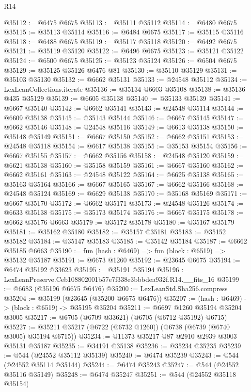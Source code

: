 \begin{lexlean}{R14}
\begin{coremodule}
@35112 := @6475 @6675
@35113 := @35111 @35112
@35114 := @6480 @6675
@35115 := @35113 @35114
@35116 := @6484 @6675
@35117 := @35115 @35116
@35118 := @6488 @6675
@35119 := @35117 @35118
@35120 := @6492 @6675
@35121 := @35119 @35120
@35122 := @6496 @6675
@35123 := @35121 @35122
@35124 := @6500 @6675
@35125 := @35123 @35124
@35126 := @6504 @6675
@35129 := @35125 @35126 @6476 @81
@35130 := @35110 @35129
@35131 := @35103 @35130
@35132 := @6662 @35131
@35133 := @24548 @35112
@35134 := LexLeanCollections.iterate
@35136 := @35134 @6603 @35108
@35138 := @35136 @435 @35129
@35139 := @6605 @35138
@35140 := @35133 @35139
@35141 := @6667 @35140
@35142 := @6662 @35141
@35143 := @24548 @35114
@35144 := @6609 @35138
@35145 := @35143 @35144
@35146 := @6667 @35145
@35147 := @6662 @35146
@35148 := @24548 @35116
@35149 := @6613 @35138
@35150 := @35148 @35149
@35151 := @6667 @35150
@35152 := @6662 @35151
@35153 := @24548 @35118
@35154 := @6617 @35138
@35155 := @35153 @35154
@35156 := @6667 @35155
@35157 := @6662 @35156
@35158 := @24548 @35120
@35159 := @6621 @35138
@35160 := @35158 @35159
@35161 := @6667 @35160
@35162 := @6662 @35161
@35163 := @24548 @35122
@35164 := @6625 @35138
@35165 := @35163 @35164
@35166 := @6667 @35165
@35167 := @6662 @35166
@35168 := @24548 @35124
@35169 := @6629 @35138
@35170 := @35168 @35169
@35171 := @6667 @35170
@35172 := @6662 @35171
@35173 := @24548 @35126
@35174 := @6633 @35138
@35175 := @35173 @35174
@35176 := @6667 @35175
@35178 := @6662 @35176 @6663
@35179 := @35172 @35178
@35180 := @35167 @35179
@35181 := @35162 @35180
@35182 := @35157 @35181
@35183 := @35152 @35182
@35184 := @35147 @35183
@35185 := @35142 @35184
@35187 := @6662 @35185 @6663
@35190 := fun (hash : @6469) => fun (block : @6519) => @35132 @35187
@35191 := @6673 @1260
@35192 := @23645 @6675
@35194 := @6474 @35192 @33623
@35195 := @35191 @35194
@35196 := LexLeanPreserve.Ceb108802001b57e7f338e3bbbdea932f.R14.__fits_16
@35199 := @6683 (@35196 @6675 @6476)
@35200 := LexLeanStd.Sha256.compress
@35204 := @35199 (@23645 (@35200 @6675 @6476))
@35207 := (hash : @6469) -> (block : @6519) -> @35195 @35204
@35211 := @6697 @1260 @35194 @35204 @3005
@35217 := @6705 (@6709 @33621) (@6705 (@6712 @35192) @6715)
@35227 := @35211 @35217 (@6722 (@6732 @1260)) (@6738 (@6739 (@6740 @3005) @35194 @6715))
@35234 := @11373 @35217 @87 @2910 @2939 @3003 @35131 @35187
@35235 := @34191 @35138
@35236 := @35234 @35235
@35239 := @544 (@24552 @35112 @35139)
@35240 := @6474 @35239
@35243 := @544 (@24552 @35114 @35144)
@35244 := @6474 @35243
@35247 := @544 (@24552 @35116 @35149)
@35248 := @6474 @35247
@35251 := @544 (@24552 @35118 @35154)

\end{coremodule}
\end{lexlean}
